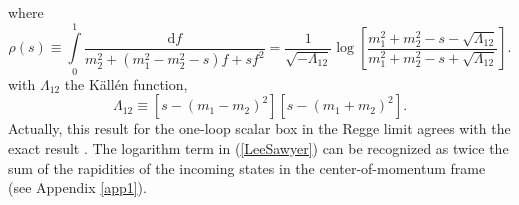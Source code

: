 where
\begin{equation}
	\rho(s) \equiv \int\limits_{0}^{1} \frac{\mathrm{d}f}{m_{2}^{2} + (m_{1}^{2} - m_{2}^{2} - s)f + s f^{2}} = \frac{1}{\sqrt{-\Lambda_{12}}} \log{\left[ \frac{m_{1}^{2} + m_{2}^{2} - s - \sqrt{\Lambda_{12}}}{m_{1}^{2} + m_{2}^{2} - s + \sqrt{\Lambda_{12}}} \right]}.
	\label{LeeSawyer}
\end{equation}
with $\Lambda_{12}$ the K\"{a}ll\'{e}n function,
\begin{equation}
	\Lambda_{12} \equiv [s - (m_{1} - m_{2})^{2}][s - (m_{1} + m_{2})^{2}].
\end{equation}
Actually, this result for the one-loop scalar box in the Regge limit agrees with the exact result \cite{PvN,tHVelt}. The logarithm term in (\ref{LeeSawyer}) can be recognized as twice the sum of the rapidities of the incoming states in the center-of-momentum frame (see Appendix \ref{app1}).

